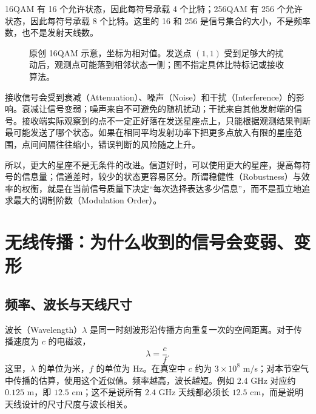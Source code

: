 16QAM 有 16 个允许状态，因此每符号承载 4 个比特；256QAM 有 256 个允许状态，因此每符号承载 8 个比特。这里的 16 和 256 是信号集合的大小，不是频率数，也不是发射天线数。

\begin{figure}[htbp]
\centering
{}
\caption{原创 16QAM 示意，坐标为相对值。发送点 $(1,1)$ 受到足够大的扰动后，观测点可能落到相邻状态一侧；图不指定具体比特标记或接收算法。}
\end{figure}

接收信号会受到衰减（Attenuation）、噪声（Noise）和干扰（Interference）的影响。衰减让信号变弱；噪声来自不可避免的随机扰动；干扰来自其他发射端的信号。接收端实际观察到的点不一定正好落在发送星座点上，只能根据观测结果判断最可能发送了哪个状态。如果在相同平均发射功率下把更多点放入有限的星座范围，点间间隔往往缩小，错误判断的风险随之上升。

所以，更大的星座不是无条件的改进。信道好时，可以使用更大的星座，提高每符号的信息量；信道差时，较少的状态更容易区分。所谓稳健性（Robustness）与效率的权衡，就是在当前信号质量下决定“每次选择表达多少信息”，而不是孤立地追求最大的调制阶数（Modulation Order）。

\section{无线传播：为什么收到的信号会变弱、变形}
\subsection{频率、波长与天线尺寸}
波长（Wavelength）$\lambda$ 是同一时刻波形沿传播方向重复一次的空间距离。对于传播速度为 $c$ 的电磁波，
\begin{equation}
\lambda=\frac{c}{f}.
\end{equation}
这里，$\lambda$ 的单位为米，$f$ 的单位为 Hz。在真空中 $c$ 约为 $3\times10^8$ m/s；对本节空气中传播的估算，使用这个近似值。频率越高，波长越短。例如 $2.4$ GHz 对应约 $0.125$ m，即 $12.5$ cm；这不是说所有 $2.4$ GHz 天线都必须长 $12.5$ cm，而是说明天线设计的尺寸尺度与波长相关。

